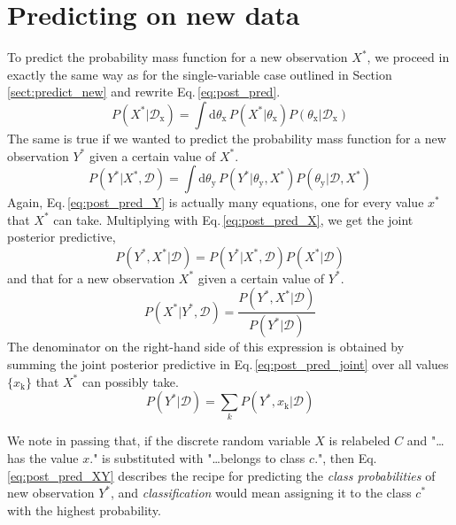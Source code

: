 \documentclass[]{report}
\begin{document}
\section{Predicting on new data}
To predict the probability mass function for a new observation $X^*$, we proceed in exactly the same way as for the single-variable case outlined in Section\,\ref{sect:predict_new} and rewrite Eq.\,\ref{eq:post_pred}.
\begin{equation} \label{eq:post_pred_X}
P( X^* | \mathcal{D}_\mathrm{x} )
= 
\int \mathrm{d}\theta_\mathrm{x} \,
	P( X^* | \theta_\mathrm{x} )
	P( \theta_\mathrm{x} | \mathcal{D}_\mathrm{x} )
\end{equation}
The same is true if we wanted to predict the probability mass function for a new observation $Y^*$ given a certain value of $X^*$.
\begin{equation} \label{eq:post_pred_Y}
P(Y^*|X^*, \mathcal{D}) = \int\mathrm{d}\theta_\mathrm{y}\,P(Y^*|\theta_\mathrm{y}, X^*)P(\theta_\mathrm{y}|\mathcal{D}, X^*)
\end{equation}
Again, Eq.\,\ref{eq:post_pred_Y} is actually many equations, one for every value $x^*$ that $X^*$ can take. Multiplying with Eq.\,\ref{eq:post_pred_X}, we get the joint posterior predictive,
\begin{equation} \label{eq:post_pred_joint}
P(Y^*, X^*|\mathcal{D}) = P(Y^*|X^*, \mathcal{D})P(X^*|\mathcal{D})
\end{equation}
and that for a new observation $X^*$ given a certain value of $Y^*$.
\begin{equation} \label{eq:post_pred_XY}
P(X^*|Y^*, \mathcal{D}) = \frac{P(Y^*, X^*|\mathcal{D})}{P(Y^*|\mathcal{D})}
\end{equation}
The denominator on the right-hand side of this expression is obtained by summing the joint posterior predictive in Eq.\,\ref{eq:post_pred_joint} over all values $\{x_\mathrm{k}\}$ that $X^*$ can possibly take.
\begin{equation}
P(Y^*|\mathcal{D}) = \sum_{k}P(Y^*, x_\mathrm{k}|\mathcal{D})
\end{equation}

We note in passing that, if the discrete random variable $X$ is relabeled $C$ and "\ldots has the value $x$." is substituted with "\ldots belongs to class $c$.", then Eq.\,\ref{eq:post_pred_XY} describes the recipe for predicting the \emph{class probabilities} of new observation $Y^*$, and \emph{classification} would mean assigning it to the class $c^*$ with the highest probability.
\end{document}
